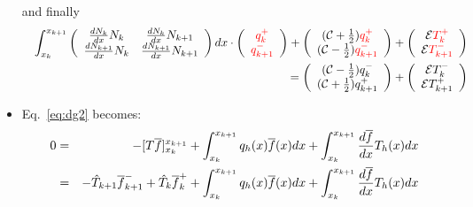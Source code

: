 \begin{itemize}
\begin{itemize}
\end{itemize}

and finally 
\begin{eqnarray}
&&\int_{x_k}^{x_{k+1}} 
\left(
\begin{array}{cc}
\frac{dN_k}{dx} N_k     & \frac{dN_k}{dx} N_{k+1} \\
\frac{dN_{k+1}}{dx} N_k & \frac{dN_{k+1}}{dx} N_{k+1}
\end{array}
\right)dx  \cdot
\left(
\begin{array}{c}
    {\color{red}q_k^+}  \\
    {\color{red}q_{k+1}^-}
\end{array}
\right)
+\left(
\begin{array}{c}
     ({\cal C}+\frac{1}{2})  {\color{red}q_k^+}  \\
     ({\cal C}-\frac{1}{2})  {\color{red}q_{k+1}^-} 
\end{array}
\right)+\left(
\begin{array}{c}
     {\cal E}    {\color{red}T_k^+}  \\
     {\cal E}    {\color{red}T_{k+1}^-} 
\end{array}
\right) \nonumber \\
&&= 
\left(
\begin{array}{c}
     ({\cal C}-\frac{1}{2}) q_k^-  \\
     ({\cal C}+\frac{1}{2}) q_{k+1}^+ 
\end{array}
\right)
+ \left(
\begin{array}{c}
     {\cal E}   T_k^-  \\
     {\cal E}   T_{k+1}^+
\end{array}
\right)  
\label{eq:dgq1}
\end{eqnarray}



\newpage
\item Eq.~\ref{eq:dg2} becomes:
\begin{eqnarray}
0&=&
-[ T \overline{f}  ]_{x_k}^{x_{k+1}} 
+ \int_{x_k}^{x_{k+1}}  q_h(x) \overline{f}(x) dx
+ \int_{x_k}^{x_{k+1}} \frac{d\overline{f}}{dx} T_h(x) dx  
\nonumber\\
&=&
-\hat{T}_{k+1} \overline{f}_{k+1}^- 
+\hat{T}_k     \overline{f}_{k}^+ 
+ \int_{x_k}^{x_{k+1}}  q_h(x) \overline{f}(x) dx
+ \int_{x_k}^{x_{k+1}} \frac{d\overline{f}}{dx} T_h(x) dx  \nonumber
\end{eqnarray}



\end{itemize}
